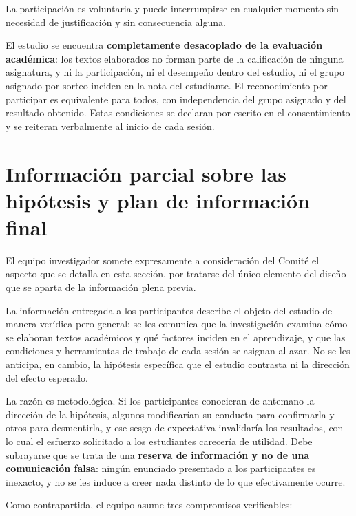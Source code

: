 \documentclass[11pt,a4paper]{article}
\newenvironment{recuadro}
	{\begin{lrbox}{\cajaguardada}\begin{minipage}{\dimexpr\textwidth-2\fboxsep\relax}\vspace{4pt}\small}
	{\vspace{4pt}\end{minipage}\end{lrbox}\par\vspace{4pt}\noindent\colorbox{grisclaro}{\usebox{\cajaguardada}}\par\vspace{6pt}}
\begin{document}
La participaci\'on es voluntaria y puede interrumpirse en cualquier momento sin necesidad de justificaci\'on y sin consecuencia alguna.

El estudio se encuentra \textbf{completamente desacoplado de la evaluaci\'on acad\'emica}: los textos elaborados no forman parte de la calificaci\'on de ninguna asignatura, y ni la participaci\'on, ni el desempe\~no dentro del estudio, ni el grupo asignado por sorteo inciden en la nota del estudiante. El reconocimiento por participar es equivalente para todos, con independencia del grupo asignado y del resultado obtenido. Estas condiciones se declaran por escrito en el consentimiento y se reiteran verbalmente al inicio de cada sesi\'on.

\section{Informaci\'on parcial sobre las hip\'otesis y plan de informaci\'on final}

\begin{recuadro}
El equipo investigador somete expresamente a consideraci\'on del Comit\'e el aspecto que se detalla en esta secci\'on, por tratarse del \'unico elemento del dise\~no que se aparta de la informaci\'on plena previa.
\end{recuadro}

La informaci\'on entregada a los participantes describe el objeto del estudio de manera ver\'idica pero general: se les comunica que la investigaci\'on examina c\'omo se elaboran textos acad\'emicos y qu\'e factores inciden en el aprendizaje, y que las condiciones y herramientas de trabajo de cada sesi\'on se asignan al azar. No se les anticipa, en cambio, la hip\'otesis espec\'ifica que el estudio contrasta ni la direcci\'on del efecto esperado.

La raz\'on es metodol\'ogica. Si los participantes conocieran de antemano la direcci\'on de la hip\'otesis, algunos modificar\'ian su conducta para confirmarla y otros para desmentirla, y ese sesgo de expectativa invalidar\'ia los resultados, con lo cual el esfuerzo solicitado a los estudiantes carecer\'ia de utilidad. Debe subrayarse que se trata de una \textbf{reserva de informaci\'on y no de una comunicaci\'on falsa}: ning\'un enunciado presentado a los participantes es inexacto, y no se les induce a creer nada distinto de lo que efectivamente ocurre.

Como contrapartida, el equipo asume tres compromisos verificables:
\end{document}

